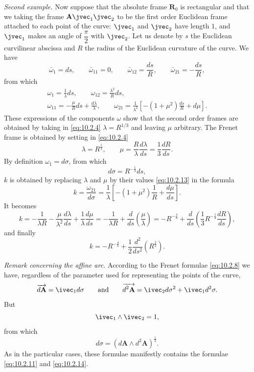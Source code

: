 \emph{Second example.} Now suppose that the absolute frame $\mathbf{R}_{0}$ is rectangular and that we taking the frame $\mathbf{A}\jvec_{1}\jvec_{2}$ to be the first order Euclidean frame attached to each point of the curve: $\jvec_{1}$ and $\jvec_{2}$ have length $1$, and $\jvec_{1}$ makes an angle of $\dfrac{\pi}{2}$ with $\jvec_{2}$. Let us denote by $s$ the Euclidean curvilinear abscissa and $R$ the radius of the Euclidean curvature of the curve. We have
\[
\bar\omega_{1}=ds,\qquad\bar\omega_{11}=0,\qquad\bar\omega_{12}=\frac{ds}{R},\qquad\bar\omega_{21}=-\frac{ds}{R},
\]
from which
\begin{gather*}
  \omega_{1}=\frac{1}{\lambda}ds,\qquad\omega_{12}=\frac{\lambda^{2}}{R}ds,\\
  \omega_{11}=-\frac{\mu}{R}ds+\frac{d\lambda}{\lambda},\qquad\omega_{21}=\frac{1}{\lambda^{2}}\left[-(1+\mu^{2})\frac{ds}{R}+d\mu\right].
\end{gather*}
These expressions of the components $\omega$ show that the second order frames are obtained by taking in \eqref{eq:10.2.4} $\lambda=R^{1/3}$ and leaving $\mu$ arbitrary. The Frenet frame is obtained by setting in \eqref{eq:10.2.4}
\begin{equation}
  \label{eq:10.2.13}
  \lambda=R^{\frac{1}{3}},\qquad\mu=\frac{R}{\lambda}\frac{d\lambda}{ds}=\frac{1}{3}\frac{dR}{ds}.
\end{equation}
By definition $\omega_{1}=d\sigma$, from which
\begin{equation}
  \label{eq:10.2.14}
  d\sigma=R^{-\frac{1}{3}}ds,
\end{equation}
$k$ is obtained by replacing $\lambda$ and $\mu$ by their values \eqref{eq:10.2.13} in the formula
\[
k=\frac{\omega_{21}}{d\sigma}=\frac{1}{\lambda}\left[-(1+\mu^{2})\frac{1}{R}+\frac{d\mu}{ds}\right].
\]
It becomes
\[
k=-\frac{1}{\lambda R}-\frac{\mu}{\lambda^{2}}\frac{d\lambda}{ds}+\frac{1}{\lambda}\frac{d\mu}{ds}=-\frac{1}{\lambda R}+\frac{d}{ds}\left(\frac{\mu}{\lambda}\right)=-R^{-\frac{4}{3}}+\frac{d}{ds}\left(\frac{1}{3}R^{-\frac{1}{3}}\frac{dR}{ds}\right),
\]
and finally
\begin{equation}
  \label{eq:10.2.15}
  k=-R^{-\frac{4}{3}}+\frac{1}{2}\frac{d^{2}}{ds^{2}}(R^{\frac{2}{3}}).
\end{equation}

\somespace

\emph{Remark concerning the affine arc.} According to the Frenet formulae \eqref{eq:10.2.8} we have, regardless of the parameter used for representing the points of the curve,
\[
\overrightarrow{d\mathbf{A}}=\ivec_{1}d\sigma\qquad\text{and}\qquad\overrightarrow{d^{2}\mathbf{A}}=\ivec_{2}d\sigma^{2}+\ivec_{1}d^{2}\sigma.
\]
But
\[
\ivec_{1}\wedge\ivec_{2}=1,
\]
from which
\begin{equation}
  \label{eq:10.2.16}
  d\sigma=(d\mathbf{A}\wedge d^{2}\mathbf{A})^{\frac{1}{3}}.
\end{equation}
As in the particular cases, these formulae manifestly contains the formulae \eqref{eq:10.2.11} and \eqref{eq:10.2.14}.



